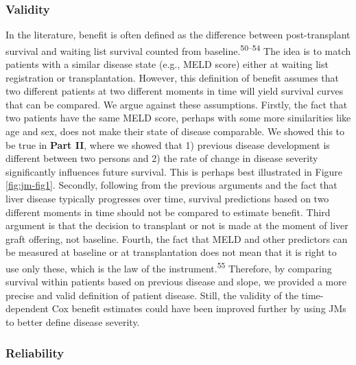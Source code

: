\documentclass[11pt,english,]{book} %
\begin{document}
\hypertarget{validity}{%
\subsubsection*{Validity}\label{validity}}

In the literature, benefit is often defined as the difference between post-transplant survival and waiting list survival counted from baseline.\textsuperscript{50--54} The idea is to match patients with a similar disease state (e.g., MELD score) either at waiting list registration or transplantation. However, this definition of benefit assumes that two different patients at two different moments in time will yield survival curves that can be compared. We argue against these assumptions. Firstly, the fact that two patients have the same MELD score, perhaps with some more similarities like age and sex, does not make their state of disease comparable. We showed this to be true in \textbf{Part II}, where we showed that 1) previous disease development is different between two persons and 2) the rate of change in disease severity significantly influences future survival. This is perhaps best illustrated in Figure \ref{fig:jm-fig1}. Secondly, following from the previous arguments and the fact that liver disease typically progresses over time, survival predictions based on two different moments in time should not be compared to estimate benefit. Third argument is that the decision to transplant or not is made at the moment of liver graft offering, not baseline. Fourth, the fact that MELD and other predictors can be measured at baseline or at transplantation does not mean that it is right to use only these, which is the law of the instrument.\textsuperscript{55} Therefore, by comparing survival within patients based on previous disease and slope, we provided a more precise and valid definition of patient disease. Still, the validity of the time-dependent Cox benefit estimates could have been improved further by using JMs to better define disease severity.

\hypertarget{reliability}{%
\subsubsection*{Reliability}\label{reliability}}
\end{document}
